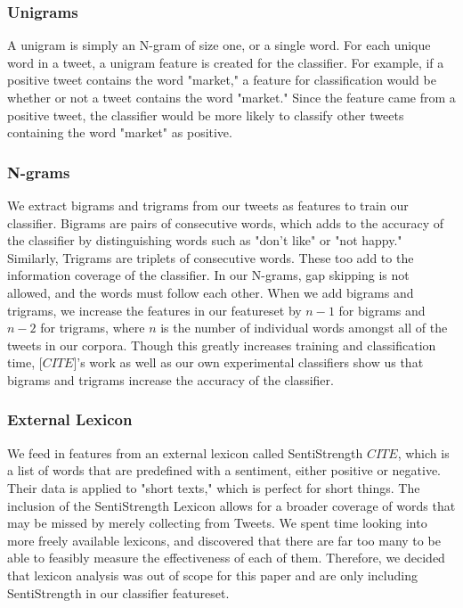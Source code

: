 \documentclass[preprint,pre,floats,aps,amsmath,amssymb,12pt]{revtex4}
\begin{document}
\subsubsection{Unigrams}
A unigram is simply an N-gram of size one, or a single word. For each unique word in a tweet, a unigram feature is created for the classifier. For example, if a positive tweet contains the word "market," a feature for classification would be whether or not a tweet contains the word "market." Since the feature came from a positive tweet, the classifier would be more likely to classify other tweets containing the word "market" as positive. 

\subsubsection{N-grams}
We extract bigrams and trigrams from our tweets as features to train our classifier. Bigrams are pairs of consecutive words, which adds to the accuracy of the classifier by distinguishing words such as "don't like" or "not happy." Similarly, Trigrams are triplets of consecutive words. These too add to the information coverage of the classifier. In our N-grams, gap skipping is not allowed, and the words must follow each other. When we add bigrams and trigrams, we increase the features in our featureset by $n-1$ for bigrams and $n-2$ for trigrams, where $n$ is the number of individual words amongst all of the tweets in our corpora. Though this greatly increases training and classification time, [$CITE$]'s work as well as our own experimental classifiers show us that bigrams and trigrams increase the accuracy of the classifier. 

\subsubsection{External Lexicon}
We feed in features from an external lexicon called SentiStrength $CITE$, which is a list of words that are predefined with a sentiment, either positive or negative. Their data is applied to "short texts," which is perfect for short things. The inclusion of the SentiStrength Lexicon allows for a broader coverage of words that may be missed by merely collecting from Tweets. We spent time looking into more freely available lexicons, and discovered that there are far too many to be able to feasibly measure the effectiveness of each of them. Therefore, we decided that lexicon analysis was out of scope for this paper and are only including SentiStrength in our classifier featureset. 
\end{document}
